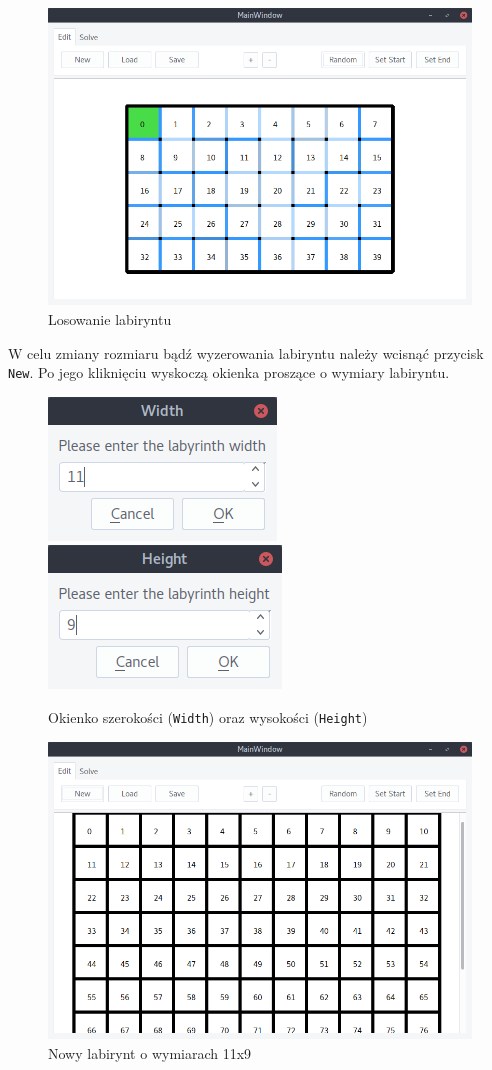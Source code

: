 \documentclass[12pt,a4paper]{article}
\begin{document}
	\begin{figure}[H]
		\centering
		\includegraphics[width=0.8\linewidth]{obrazki/2.png}
		\caption{Losowanie labiryntu}
	\end{figure}
	
	W celu zmiany rozmiaru bądź wyzerowania labiryntu należy wcisnąć
	przycisk \texttt{New}. Po jego kliknięciu wyskoczą okienka proszące
	o wymiary labiryntu.
	\begin{figure}[H]
		\centering
		\includegraphics[width=0.39\linewidth]{obrazki/14.png}
		\includegraphics[width=0.40\linewidth]{obrazki/15.png}
		\caption{Okienko szerokości (\texttt{Width}) oraz wysokości
		(\texttt{Height})}
	\end{figure}
	
	\begin{figure}[H]
		\centering
		\includegraphics[width=0.8\linewidth]{obrazki/16.png}
		\caption{Nowy labirynt o wymiarach 11x9}
	\end{figure}
	
\end{document}
